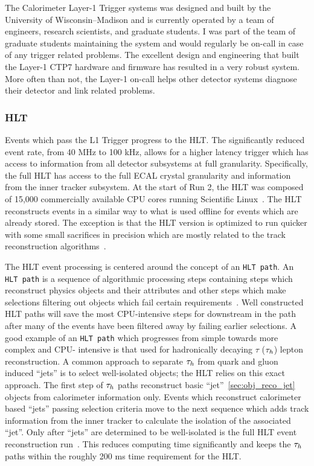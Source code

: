 The Calorimeter Layer-1 Trigger systems was designed and built by the University of
Wisconsin--Madison and is currently operated by a team of engineers, research
scientists, and graduate students. I was part of the team of graduate students maintaining
the system and would regularly be on-call in case of any trigger related problems. The
excellent design and engineering that built the Layer-1 CTP7 hardware and firmware
has resulted in a very robust system. More often than not, the Layer-1 on-call
helps other detector systems diagnose their detector and link related problems.



\subsubsection{HLT}
Events which pass the L1 Trigger progress to the HLT. The significantly reduced
event rate, from 40 MHz to 100 kHz, allows for a higher latency trigger which
has access to information from all detector subsystems at full granularity.
Specifically, the full HLT has access to the full ECAL crystal granularity and
information from the inner tracker subsystem. At the start of Run 2, the HLT
was composed of 15,000 commercially available CPU cores running Scientific
Linux~\cite{cms_daq_7097437}. The HLT reconstructs events in a similar way
to what is used offline for events which are already stored. The exception
is that the HLT version is optimized to run quicker with some small sacrifices 
in precision which are mostly related to the track reconstruction 
algorithms~\cite{Khachatryan:2016bia}.

The HLT event processing is centered around the concept of an \texttt{HLT path}.
An \texttt{HLT path} is a sequence of algorithmic processing steps containing
steps which reconstruct physics objects and their attributes and other steps
which make selections filtering out objects which fail certain 
requirements~\cite{Khachatryan:2016bia}. Well constructed HLT paths will
save the most CPU-intensive steps for downstream in the path after many of the
events have been filtered away by failing earlier selections. A good example
of an \texttt{HLT path} which progresses from simple towards more complex and CPU-
intensive is that used for hadronically decaying $\tau$ ($\tau_{h}$) lepton reconstruction.
A common approach to separate $\tau_{h}$ from quark and gluon induced ``jets'' is
to select well-isolated objects; the HLT relies on this exact approach.
The first step of $\tau_{h}$ paths reconstruct basic ``jet''~\ref{sec:obj_reco_jet} objects from
calorimeter information only. Events which reconstruct calorimeter based ``jets''
passing selection criteria move to the next sequence which adds track information 
from the inner tracker to calculate the isolation of the associated ``jet''.
Only after ``jets'' are determined to be well-isolated is the full HLT event 
reconstruction run~\cite{Khachatryan:2016bia}. This reduces computing time significantly
and keeps the $\tau_{h}$ paths within the roughly 200 ms time requirement for
the HLT.

